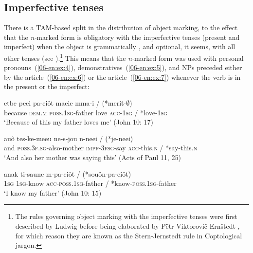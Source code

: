 \documentclass[output=paper]{LSP/langsci}
\begin{document}
\subsection{Imperfective tenses}
\label{06-en-sec:2-1}

There is a TAM-based split in the distribution of object marking, to the effect that the \textit{n-}marked form is obligatory with the imperfective tenses (present and imperfect) when the object is grammatically , and optional, it seems, with all other tenses (see ).\footnote{The rules governing object marking with the imperfective tenses were first described by Ludwig \citet{Stern1880Koptische} before being elaborated by Pëtr Viktorovič Ernštedt \citep{Jernstedt1927Koptische}, for which reason they are known as the Stern-Jernstedt rule in Coptological jargon.} This means that the \textit{n-}marked form was used with personal pronouns~(\ref{06-en:ex:4}), demonstratives~(\ref{06-en:ex:5}), and NPs preceded either by the  article~(\ref{06-en:ex:6}) or the  article~(\ref{06-en:ex:7}) whenever the verb is in the present or the imperfect:

\begin{exe}
\ex \label{06-en:ex:4}
\gll etbe peei pa-eiôt maeie mma-i / (*merit-${\emptyset}$) \\
	because \textsc{dem.m} \textsc{poss.1sg-}father love \textsc{acc-}1\textsc{sg} / *love-1\textsc{sg}\\
\glt ‘Because of this my father loves me’ (John 10: 17)
\end{exe}

\begin{exe}
\ex \label{06-en:ex:5}
\gll auô tes-ke-meeu ne-s-jou n-neei / (*je-neei)\\
	and \textsc{poss.3f.sg-}also-mother \textsc{impf-}3\textsc{fsg-}say \textsc{acc-}this.\textsc{n} / *say-this.\textsc{n}\\
\glt ‘And also her mother was saying this’ (Acts of Paul 11, 25)
\end{exe}

\begin{exe}
\ex \label{06-en:ex:6}
\gll anak ti-saune m-pa-eiôt / (*souôn-pa-eiôt)\\
	\textsc{1sg} \textsc{1sg-}know \textsc{acc-}\textsc{poss.1sg-}father / *know-\textsc{poss.1sg-}father\textsc{}\\
\glt ‘I know my father’ (John 10: 15)
\end{exe}
\end{document}
